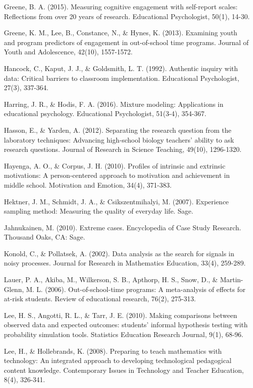 \documentclass[]{book}
\theoremstyle{definition}
\theoremstyle{definition}
\theoremstyle{definition}
\theoremstyle{remark}
\begin{document}
Greene, B. A. (2015). Measuring cognitive engagement with self-report
scales: Reflections from over 20 years of research. Educational
Psychologist, 50(1), 14-30.

Greene, K. M., Lee, B., Constance, N., \& Hynes, K. (2013). Examining
youth and program predictors of engagement in out-of-school time
programs. Journal of Youth and Adolescence, 42(10), 1557-1572.

Hancock, C., Kaput, J. J., \& Goldsmith, L. T. (1992). Authentic inquiry
with data: Critical barriers to classroom implementation. Educational
Psychologist, 27(3), 337-364.

Harring, J. R., \& Hodis, F. A. (2016). Mixture modeling: Applications
in educational psychology. Educational Psychologist, 51(3-4), 354-367.

Hasson, E., \& Yarden, A. (2012). Separating the research question from
the laboratory techniques: Advancing high‐school biology teachers'
ability to ask research questions. Journal of Research in Science
Teaching, 49(10), 1296-1320.

Hayenga, A. O., \& Corpus, J. H. (2010). Profiles of intrinsic and
extrinsic motivations: A person-centered approach to motivation and
achievement in middle school. Motivation and Emotion, 34(4), 371-383.

Hektner, J. M., Schmidt, J. A., \& Csikszentmihalyi, M. (2007).
Experience sampling method: Measuring the quality of everyday life.
Sage.

Jahnukainen, M. (2010). Extreme cases. Encyclopedia of Case Study
Research. Thousand Oaks, CA: Sage.

Konold, C., \& Pollatsek, A. (2002). Data analysis as the search for
signals in noisy processes. Journal for Research in Mathematics
Education, 33(4), 259-289.

Lauer, P. A., Akiba, M., Wilkerson, S. B., Apthorp, H. S., Snow, D., \&
Martin-Glenn, M. L. (2006). Out-of-school-time programs: A meta-analysis
of effects for at-risk students. Review of educational research, 76(2),
275-313.

Lee, H. S., Angotti, R. L., \& Tarr, J. E. (2010). Making comparisons
between observed data and expected outcomes: students' informal
hypothesis testing with probability simulation tools. Statistics
Education Research Journal, 9(1), 68-96.

Lee, H., \& Hollebrands, K. (2008). Preparing to teach mathematics with
technology: An integrated approach to developing technological
pedagogical content knowledge. Contemporary Issues in Technology and
Teacher Education, 8(4), 326-341.
\end{document}
